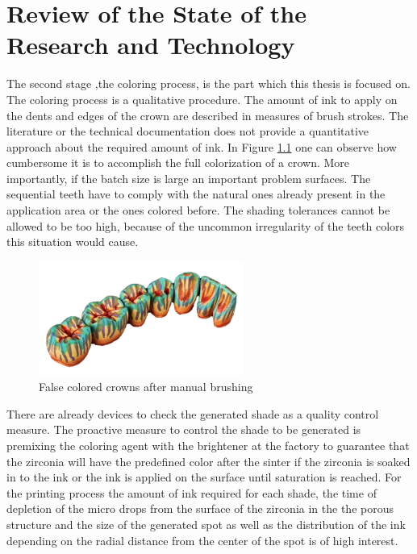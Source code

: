 \chapter{Review of the State of the Research and Technology}
\label{sec:kritik_stand_technik}
The second stage ,the coloring process, is the part which this thesis is focused on. The coloring process is a qualitative procedure. The amount of ink to apply on the dents and edges of the crown are described in measures of brush strokes. The literature or the technical documentation does not provide a quantitative approach about the required amount of ink. In Figure \ref{fig:false_colored} one can observe how cumbersome it is to accomplish the full colorization of a crown. More importantly, if the batch size is large an important problem surfaces. The sequential teeth have to comply with the natural ones already present in the application area or the ones colored before. The shading tolerances cannot be allowed to be too high, because of the uncommon irregularity of the teeth colors this situation would cause.
\bigskip
\begin{figure}[h]
	\centering
	\includegraphics[width=0.6\textwidth]{grafiken/false_colored.png}
	\caption{False colored crowns after manual brushing \citep{zirkonzahn2018}}
	\label{fig:false_colored}
\end{figure}
\bigskip

There are already devices to check the generated shade as a quality control measure. The proactive measure to control the shade to be generated is premixing the coloring agent with the brightener at the factory to guarantee that the zirconia will have the predefined color after the sinter if the zirconia is soaked in to the ink or the ink is applied on the surface until saturation is reached.
For the printing process the amount of ink required for each shade, the time of depletion of the micro drops from the surface of the zirconia in the the porous structure and the size of the generated spot as well as the distribution of the ink depending on the radial distance from the center of the spot is of high interest.